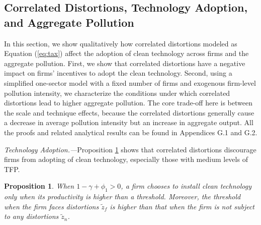 \documentclass[AEJ]{AEA}
\newtheorem{proposition}{Proposition}
\begin{document}
\subsection{Correlated Distortions, Technology Adoption, and Aggregate Pollution}
\label{sec:analytical}

In this section, we show qualitatively how correlated distortions modeled as Equation (\ref{eq:tax}) affect the adoption of clean technology across firms and the aggregate pollution. First, we show that correlated distortions have a negative impact on firms' incentives to adopt the clean technology. Second, using a simplified one-sector model with a fixed number of firms and exogenous firm-level pollution intensity, we characterize the conditions under which correlated distortions lead to higher aggregate pollution. The core trade-off here is between the scale and technique effects, because the correlated distortions generally cause a decrease in average pollution intensity but an increase in aggregate output. All the proofs and related analytical results can be found in Appendices G.1 and G.2. %

\textit{Technology Adoption.---}Proposition \ref{prop:friction} shows that correlated distortions discourage firms from adopting of clean technology, especially those with medium levels of TFP.
\begin{proposition}
\label{prop:friction}
When $1-\gamma+\phi_1>0$, a firm chooses to install clean technology only when its productivity is higher than a threshold. Moreover, the threshold when the firm faces distortions $\tilde{z}_f$ is higher than that when the firm is not subject to any distortions $\tilde{z}_n$.
\end{proposition}
\end{document}
